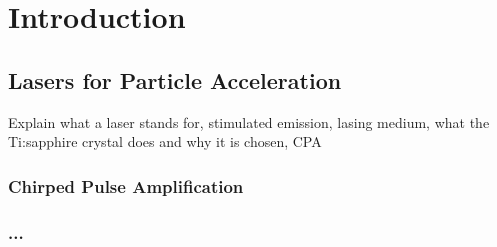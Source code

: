 \chapter{Introduction}

\section{Lasers for Particle Acceleration}

Explain what a laser stands for, stimulated emission, lasing medium, what the Ti:sapphire crystal does and why it is chosen, CPA

\subsection{Chirped Pulse Amplification}

\subsection{...}

%

